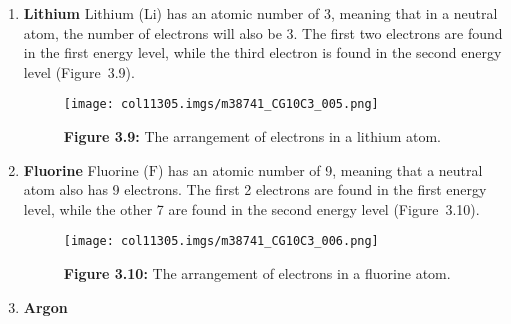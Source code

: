         \label{m38741*id259361}\begin{enumerate}[noitemsep, label=\textbf{\arabic*}. ] 
            \label{m38741*uid86}\item \textbf{Lithium}
Lithium (Li) has an atomic number of 3, meaning that in a neutral atom, the number of electrons will also be 3. The first two electrons are found in the first energy level, while the third electron is found in the second energy level (Figure~3.9).
    \setcounter{subfigure}{0}
	\begin{figure}[H] %
    \begin{center}
    \label{m38741*uid87!!!underscore!!!media}\label{m38741*uid87!!!underscore!!!printimage}\texttt{[image: col11305.imgs/m38741\_CG10C3\_005.png]} %
      \vspace{2pt}
    \vspace{\rubberspace}\par \begin{cnxcaption}
	  \small \textbf{Figure 3.9: }The arrangement of electrons in a lithium atom.
	\end{cnxcaption}
    \vspace{.1in}
    \end{center}
 \end{figure}       \label{m38741*uid88}\item \textbf{Fluorine}
Fluorine ($\mathrm{F}$) has an atomic number of 9, meaning that a neutral atom also has 9 electrons. The first 2 electrons are found in the first energy level, while the other 7 are found in the second energy level (Figure~3.10).
    \setcounter{subfigure}{0}
	\begin{figure}[H] %
    \begin{center}
    \label{m38741*uid89!!!underscore!!!media}\label{m38741*uid89!!!underscore!!!printimage}\texttt{[image: col11305.imgs/m38741\_CG10C3\_006.png]} %
      \vspace{2pt}
    \vspace{\rubberspace}\par \begin{cnxcaption}
	  \small \textbf{Figure 3.10: }The arrangement of electrons in a fluorine atom.
	\end{cnxcaption}
    \vspace{.1in}
    \end{center}
 \end{figure}       \label{m38741*uid90}\item \textbf{Argon}

\end{enumerate}

